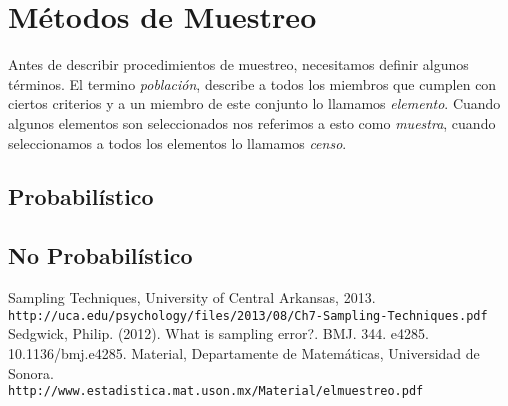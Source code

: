 \documentclass[10pt,letterpaper]{article}
\begin{document}
\section{Métodos de Muestreo}
Antes de describir procedimientos de muestreo, necesitamos definir algunos términos. El termino \textit{población}, describe a todos los miembros que cumplen con ciertos criterios y a un miembro de este conjunto lo llamamos \textit{elemento}. Cuando algunos elementos son seleccionados nos referimos a esto como \textit{muestra}, cuando seleccionamos a todos los elementos lo llamamos \textit{censo}.
\subsection{Probabilístico}
\subsection{No Probabilístico}

\begin{thebibliography}{9}
Sampling Techniques, University of Central Arkansas, 2013. \\\texttt{http://uca.edu/psychology/files/2013/08/Ch7-Sampling-Techniques.pdf}
Sedgwick, Philip. (2012). What is sampling error?. BMJ. 344. e4285. 10.1136/bmj.e4285. 
Material, Departamente de Matemáticas, Universidad de Sonora.\\\texttt{http://www.estadistica.mat.uson.mx/Material/elmuestreo.pdf}

\end{thebibliography}
\end{document}
